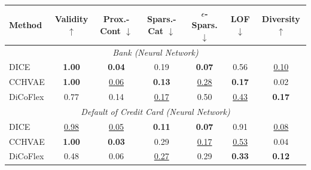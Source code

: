 \begin{table}[H]
\label{tab:protocol_B}
\centering
\setlength{\tabcolsep}{3pt}
\begin{tabular}{lcccccc}
\toprule
\textbf{Method} & \textbf{Validity $\uparrow$} & \textbf{Prox.-Cont $\downarrow$} & \textbf{Spars.-Cat $\downarrow$} & \textbf{$\epsilon$-Spars. $\downarrow$} & \textbf{LOF $\downarrow$} & \textbf{Diversity $\uparrow$} \\
\midrule
\multicolumn{7}{c}{\textit{Bank (Neural Network)}} \\
\midrule
DICE & \textbf{1.00} & \textbf{0.04} & 0.19 & \textbf{0.07} & 0.56 & \underline{0.10} \\
CCHVAE & \textbf{1.00} & \underline{0.06} & \textbf{0.13} & \underline{0.28} & \textbf{0.17} & 0.02 \\
DiCoFlex & 0.77 & 0.14 & \underline{0.17} & 0.50 & \underline{0.43} & \textbf{0.17} \\
\multicolumn{7}{c}{\textit{Default of Credit Card (Neural Network)}} \\
\midrule
DICE & \underline{0.98} & \underline{0.05} & \textbf{0.11} & \textbf{0.07} & 0.91 & \underline{0.08} \\
CCHVAE & \textbf{1.00} & \textbf{0.03} & 0.29 & \underline{0.17} & \underline{0.53} & 0.04 \\
DiCoFlex & 0.48 & 0.06 & \underline{0.27} & 0.29 & \textbf{0.33} & \textbf{0.12} \\
\bottomrule
\end{tabular}
\end{table}
